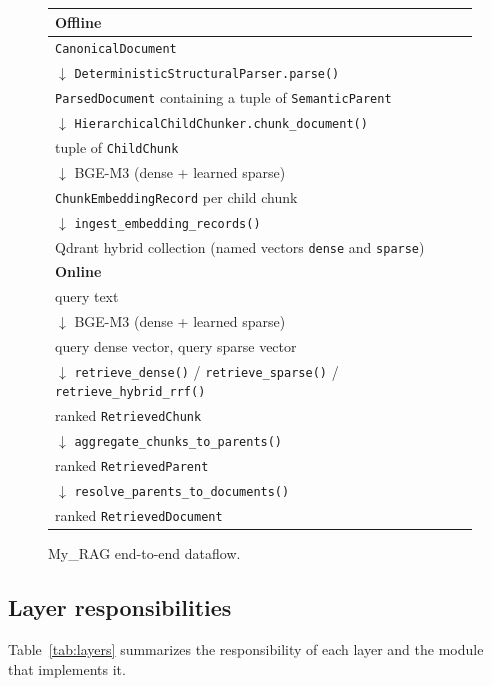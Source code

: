 \documentclass[11pt,a4paper]{article}
\begin{document}
\begin{figure}[h]
\centering
\small
\begin{tabular}{l}
\hline
\textbf{Offline}\\
\hline
\texttt{CanonicalDocument}\\
$\downarrow$ \texttt{DeterministicStructuralParser.parse()} \\
\texttt{ParsedDocument} containing a tuple of \texttt{SemanticParent} \\
$\downarrow$ \texttt{HierarchicalChildChunker.chunk\_document()} \\
tuple of \texttt{ChildChunk} \\
$\downarrow$ BGE-M3 (dense + learned sparse) \\
\texttt{ChunkEmbeddingRecord} per child chunk \\
$\downarrow$ \texttt{ingest\_embedding\_records()} \\
Qdrant hybrid collection (named vectors \texttt{dense} and \texttt{sparse}) \\
\hline
\textbf{Online}\\
\hline
query text\\
$\downarrow$ BGE-M3 (dense + learned sparse) \\
query dense vector, query sparse vector \\
$\downarrow$ \texttt{retrieve\_dense()} / \texttt{retrieve\_sparse()} / \texttt{retrieve\_hybrid\_rrf()} \\
ranked \texttt{RetrievedChunk} \\
$\downarrow$ \texttt{aggregate\_chunks\_to\_parents()} \\
ranked \texttt{RetrievedParent} \\
$\downarrow$ \texttt{resolve\_parents\_to\_documents()} \\
ranked \texttt{RetrievedDocument} \\
\hline
\end{tabular}
\caption{My\_RAG end-to-end dataflow.}
\label{fig:pipeline}
\end{figure}

\subsection{Layer responsibilities}
Table~\ref{tab:layers} summarizes the responsibility of each layer and
the module that implements it.
\end{document}
